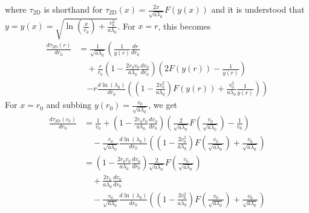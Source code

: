 \documentclass[aps,prl,twocolumn,showpacs,superscriptaddress,groupedaddress]{revtex4-1}  %
\begin{document}
where $\tau_\text{2D}$ is shorthand for $\tau_\text{2D}(x) = \frac{2 x}{\sqrt{a \lambda_0}} F\left(y(x)\right)$ and it is understood that $y = y(x) = \sqrt{\ln \left(\frac{x}{r_0}\right) + \frac{v_0^2}{a\lambda_0}}$.  For $x=r$, this becomes
\begin{align}
   \frac{d \tau_\text{2D}(r)}{d r_0} &=\frac{1}{\sqrt{a \lambda_0}}\left( \frac{1}{y(r)} \frac{dr}{dr_0}\right.\nonumber\\
                                                     &\quad + \frac{r}{r_0}\left(1- \frac{2 r_0 v_0 }{a\lambda_0}\frac{d v_0}{d r_0} \right) \left(2 F(y(r)) - \frac{1}{y(r)}\right)\nonumber\\
                                                     &\quad \left.- r \frac{d\ln(\lambda_0)}{d r_0} \left(\left(1 - \frac{2 v_0^2}{a \lambda_0}\right) F(y(r))+ \frac{v_0^2}{a \lambda_0}\frac{1}{y(r)} \right)\right)\label{eq:derivative tau 2D for r}    
\end{align}
For $x = r_0$ and subbing $y(r_0) = \frac{v_0}{\sqrt{a \lambda_0}}$, we get
\begin{align}
  \frac{d \tau_\text{2D}(r_0)}{d r_0} &= \frac{1}{v_0} + \left(1- \frac{2 r_0 v_0 }{a\lambda_0}\frac{d v_0}{d r_0} \right) \left(\frac{2}{\sqrt{a\lambda_0}} F\left(\frac{v_0}{\sqrt{a \lambda_0}}\right) - \frac{1}{v_0}\right)\nonumber\\
                                                       &\quad - \frac{r_0}{\sqrt{a \lambda_0}} \frac{d\ln(\lambda_0)}{d r_0} \left(\left(1 -  \frac{2 v_0^2}{a \lambda_0}\right)F\left(\frac{v_0}{\sqrt{a \lambda_0}}\right)  + \frac{v_0}{\sqrt{a \lambda_0}} \right)\nonumber\\
                                                       &=\left(1- \frac{2 r_0 v_0 }{a\lambda_0}\frac{d v_0}{d r_0} \right) \frac{2}{\sqrt{a\lambda_0}} F\left(\frac{v_0}{\sqrt{a \lambda_0}}\right)\nonumber\\
                                                       &\quad + \frac{2 r_0 }{a\lambda_0}\frac{d v_0}{d r_0}\nonumber\\ 
                                                       &\quad - \frac{r_0}{\sqrt{a \lambda_0}} \frac{d\ln(\lambda_0)}{d r_0} \left(\left(1 -  \frac{2 v_0^2}{a \lambda_0}\right)F\left(\frac{v_0}{\sqrt{a \lambda_0}}\right)  + \frac{v_0}{\sqrt{a \lambda_0}} \right)\label{eq:derivative tau 2D for r_0} 
\end{align}
\end{document}

